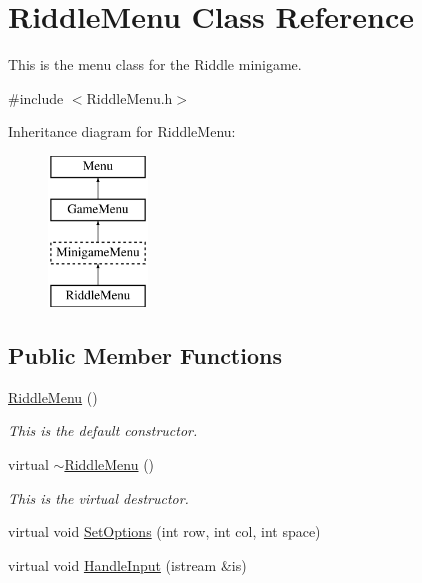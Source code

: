 \hypertarget{classRiddleMenu}{\section{Riddle\-Menu Class Reference}
\label{classRiddleMenu}
}


This is the menu class for the Riddle minigame.  




{\ttfamily \#include $<$Riddle\-Menu.\-h$>$}

Inheritance diagram for Riddle\-Menu\-:\begin{figure}[H]
\begin{center}
\leavevmode
\includegraphics[height=4.000000cm]{classRiddleMenu}
\end{center}
\end{figure}
\subsection*{Public Member Functions}
\begin{DoxyCompactItemize}
\item 
\hyperlink{classRiddleMenu_a68e4be3bbc49bdb2f3d8a9fda74614d9}{Riddle\-Menu} ()
\begin{DoxyCompactList}\small\item\em This is the default constructor. \end{DoxyCompactList}\item 
virtual \hyperlink{classRiddleMenu_a9366deb179c1145947e37d599216d64e}{$\sim$\-Riddle\-Menu} ()
\begin{DoxyCompactList}\small\item\em This is the virtual destructor. \end{DoxyCompactList}\item 
virtual void \hyperlink{classRiddleMenu_a2d103283c58744ffa0e77e62a24e7ccb}{Set\-Options} (int row, int col, int space)
\item 
virtual void \hyperlink{classRiddleMenu_aef67f984c1aad0b8240e03b43ccbe615}{Handle\-Input} (istream \&is)
\end{DoxyCompactItemize}
